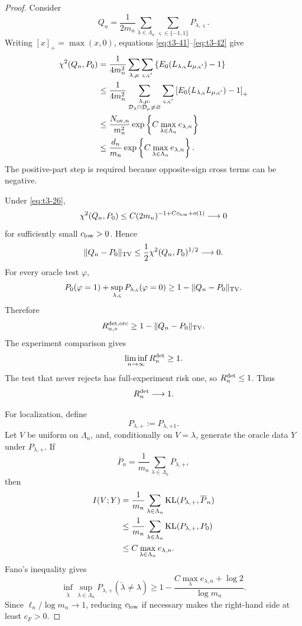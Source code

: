 \documentclass[11pt]{article}
\theoremstyle{definition}
\newcommand{\1}{\mathbf 1}\newcommand{\op}{\operatorname}
\begin{document}
\begin{proof}
Consider
\[
Q_n
=
\frac1{2m_n}
\sum_{\lambda\in\Lambda_n}
\sum_{\varsigma\in\{-1,1\}}
P_{\lambda,\varsigma}.
\]
Writing \([x]_+=\max(x,0)\), equations
\eqref{eq:t3-41}--\eqref{eq:t3-42} give
\begin{align}
\chi^2(Q_n,P_0)
&=
\frac1{4m_n^2}
\sum_{\lambda,\mu}
\sum_{\varsigma,\varsigma'}
\left\{
E_0
(L_{\lambda,\varsigma}L_{\mu,\varsigma'})
-1
\right\}
\notag\\
&\le
\frac1{4m_n^2}
\sum_{\substack{\lambda,\mu:\\
\mathcal D_\lambda\cap\mathcal D_\mu\ne\varnothing}}
\sum_{\varsigma,\varsigma'}
\left[
E_0
(L_{\lambda,\varsigma}L_{\mu,\varsigma'})
-1
\right]_+
\notag\\
&\le
\frac{N_{{\rm ov},n}}{m_n^2}
\exp\left\{
C\max_{\lambda\in\Lambda_n}e_{\lambda,n}
\right\}
\notag\\
&\le
\frac{d_n}{m_n}
\exp\left\{
C\max_{\lambda\in\Lambda_n}e_{\lambda,n}
\right\}.
\label{eq:t3-43}
\end{align}
The positive-part step is required because opposite-sign cross terms
can be negative.

Under \eqref{eq:t3-26},
\[
\chi^2(Q_n,P_0)
\le
C(2m_n)^{-1+Cc_{\rm low}+o(1)}
\longrightarrow0
\]
for sufficiently small \(c_{\rm low}>0\).  Hence
\[
\|Q_n-P_0\|_{\rm TV}
\le
\frac12\chi^2(Q_n,P_0)^{1/2}
\longrightarrow0.
\]
For every oracle test \(\varphi\),
\[
P_0(\varphi=1)
+
\sup_{\lambda,\varsigma}
P_{\lambda,\varsigma}(\varphi=0)
\ge
1-\|Q_n-P_0\|_{\rm TV}.
\]
Therefore
\[
R_{n,\circ}^{\rm det,orc}
\ge
1-\|Q_n-P_0\|_{\rm TV}.
\]
The experiment comparison gives
\[
\liminf_{n\to\infty}R_n^{\rm det}\ge1.
\]
The test that never rejects has full-experiment risk one, so
\(R_n^{\rm det}\le1\).  Thus
\[
R_n^{\rm det}\longrightarrow1.
\]

For localization, define
\[
P_{\lambda,+}:=P_{\lambda,+1}.
\]
Let \(V\) be uniform on \(\Lambda_n\), and, conditionally on
\(V=\lambda\), generate the oracle data \(Y\) under \(P_{\lambda,+}\).
If
\[
\overline P_n
=
\frac1{m_n}
\sum_{\lambda\in\Lambda_n}P_{\lambda,+},
\]
then
\begin{align}
I(V;Y)
&=
\frac1{m_n}
\sum_{\lambda\in\Lambda_n}
\operatorname{KL}(P_{\lambda,+},\overline P_n)
\notag\\
&\le
\frac1{m_n}
\sum_{\lambda\in\Lambda_n}
\operatorname{KL}(P_{\lambda,+},P_0)
\notag\\
&\le
C\max_{\lambda\in\Lambda_n}e_{\lambda,n}.
\label{eq:t3-44}
\end{align}
Fano's inequality gives
\begin{equation}
\inf_{\check\lambda}
\sup_{\lambda\in\Lambda_n}
P_{\lambda,+}(\check\lambda\ne\lambda)
\ge
1-
\frac{
C\max_\lambda e_{\lambda,n}+\log2
}{
\log m_n
}.
\label{eq:t3-45}
\end{equation}
Since \(\ell_n/\log m_n\to1\), reducing \(c_{\rm low}\) if necessary
makes the right-hand side at least \(c_F>0\).


\end{proof}
\end{document}

